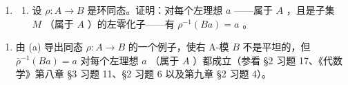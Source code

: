 \begin{enumerate}
\def\labelenumi{\arabic{enumi}.}
\setcounter{enumi}{9}
\tightlist
\item
  \begin{enumerate}
  \def\labelenumii{(\alph{enumii})}
  \tightlist
  \item
  设 \(\rho: A \to B\) 是环同态。证明：对每个左理想 \(a\) ——属于 \(A\) ，且是子集 \(M\) （属于 \(A\) ）的左零化子——有 \(\rho^{-1}(Ba) = a\) 。
  \end{enumerate}
\end{enumerate}

\begin{enumerate}
\def\labelenumi{(\alph{enumi})}
\setcounter{enumi}{1}
\tightlist
\item
由 (a) 导出同态 \(\rho: A \to B\) 的一个例子，使右 A-模 \(B\) 不是平坦的，但 \(\bar{\rho}^{-1}(Ba) = a\) 对每个左理想 \(a\) （属于 \(A\) ）都成立（参看 §2 习题 17、《代数学》第八章 §3 习题 11、§2 习题 6 以及第九章 §2 习题 4）。
\end{enumerate}

